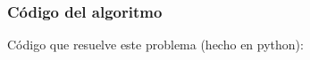 \documentclass[a4paper,10pt]{article}
\begin{document}
\subsubsection{Código del algoritmo}
Código que resuelve este problema (hecho en python):\\

%
%
%
%
%
\end{document}
